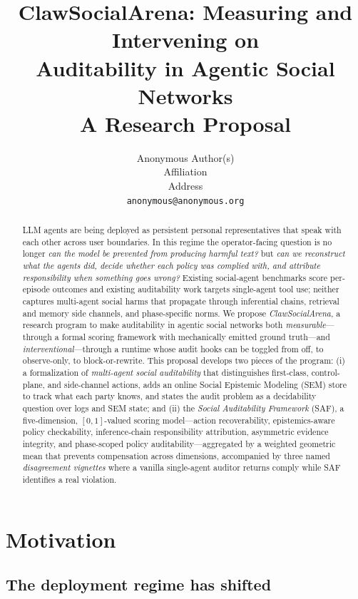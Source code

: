 \documentclass{article}
\title{ClawSocialArena: Measuring and Intervening on\\ Auditability in Agentic Social Networks\\
\large A Research Proposal}
\author{%
  Anonymous Author(s) \\
  Affiliation \\
  Address \\
  \texttt{anonymous@anonymous.org} \\
}
\begin{document}
\maketitle

\begin{abstract}
LLM agents are being deployed as persistent personal representatives that speak with each other across user boundaries. In this regime the operator-facing question is no longer \emph{can the model be prevented from producing harmful text?} but \emph{can we reconstruct what the agents did, decide whether each policy was complied with, and attribute responsibility when something goes wrong?} Existing social-agent benchmarks score per-episode outcomes and existing auditability work targets single-agent tool use; neither captures multi-agent social harms that propagate through inferential chains, retrieval and memory side channels, and phase-specific norms. We propose \emph{ClawSocialArena}, a research program to make auditability in agentic social networks both \emph{measurable}---through a formal scoring framework with mechanically emitted ground truth---and \emph{interventional}---through a runtime whose audit hooks can be toggled from off, to observe-only, to block-or-rewrite. This proposal develops two pieces of the program: (i) a formalization of \emph{multi-agent social auditability} that distinguishes first-class, control-plane, and side-channel actions, adds an online Social Epistemic Modeling (SEM) store to track what each party knows, and states the audit problem as a decidability question over logs and SEM state; and (ii) the \emph{Social Auditability Framework} (SAF), a five-dimension, $[0,1]$-valued scoring model---action recoverability, epistemics-aware policy checkability, inference-chain responsibility attribution, asymmetric evidence integrity, and phase-scoped policy auditability---aggregated by a weighted geometric mean that prevents compensation across dimensions, accompanied by three named \emph{disagreement vignettes} where a vanilla single-agent auditor returns \textsf{comply} while SAF identifies a real violation.
\end{abstract}

\section{Motivation}
\label{sec:motivation}

\subsection{The deployment regime has shifted}
\label{sec:motivation:shift}
\end{document}
